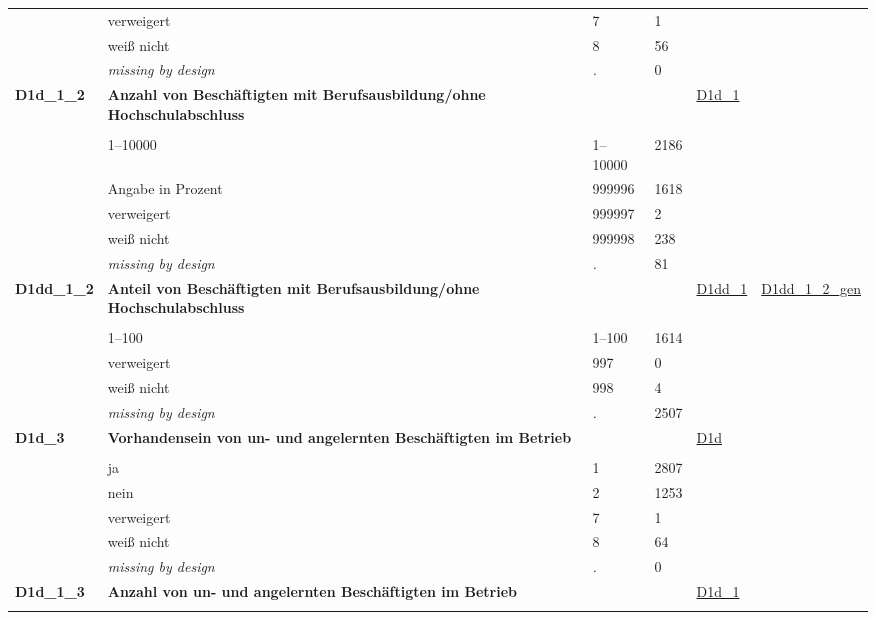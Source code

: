 \begin{longtable}{| L{2.45cm} | L{6cm} | C{1.5cm} | R{1cm} | C{2.25cm} | C{2.25cm} |}
   & verweigert & 7 & 1 &  &  \\ 
   & weiß nicht & 8 & 56 &  &  \\ 
   & \textit{missing by design} & \textit{.} & 0 &  &  \\ 
   \midrule
\textbf{D1d\_1\_2}\label{var:D1d:1:2} & \textbf{Anzahl von Beschäftigten mit Berufsausbildung/ohne Hochschulabschluss} &  &  & \hyperref[D1d:1]{D1d\_1} & \hyperref[var:suf:]{} \\ 
   &  &  &  &  &  \\ 
   & 1--10000 & 1--10000 & 2186 &  &  \\ 
   & Angabe in Prozent & 999996 & 1618 &  &  \\ 
   & verweigert & 999997 & 2 &  &  \\ 
   & weiß nicht & 999998 & 238 &  &  \\ 
   & \textit{missing by design} & \textit{.} & 81 &  &  \\ 
   \midrule
\textbf{D1dd\_1\_2}\label{var:D1dd:1:2} & \textbf{Anteil von Beschäftigten mit Berufsausbildung/ohne Hochschulabschluss} &  &  & \hyperref[D1dd:1]{D1dd\_1} & \hyperref[var:suf:D1dd:1:2:gen]{D1dd\_1\_2\_gen} \\ 
   &  &  &  &  &  \\ 
   & 1--100 & 1--100 & 1614 &  &  \\ 
   & verweigert & 997 & 0 &  &  \\ 
   & weiß nicht & 998 & 4 &  &  \\ 
   & \textit{missing by design} & \textit{.} & 2507 &  &  \\ 
   \midrule
\textbf{D1d\_3}\label{var:D1d:3} & \textbf{Vorhandensein von un- und angelernten Beschäftigten im Betrieb} &  &  & \hyperref[D1d]{D1d} & \hyperref[var:suf:]{} \\ 
   &  &  &  &  &  \\ 
   & ja & 1 & 2807 &  &  \\ 
   & nein & 2 & 1253 &  &  \\ 
   & verweigert & 7 & 1 &  &  \\ 
   & weiß nicht & 8 & 64 &  &  \\ 
   & \textit{missing by design} & \textit{.} & 0 &  &  \\ 
   \midrule
\textbf{D1d\_1\_3}\label{var:D1d:1:3} & \textbf{Anzahl von un- und angelernten Beschäftigten im Betrieb} &  &  & \hyperref[D1d:1]{D1d\_1} & \hyperref[var:suf:]{} \\ 
   &  &  &  &  &  \\ 

\end{longtable}
